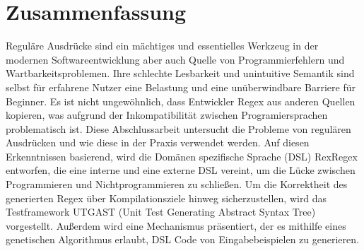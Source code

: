 \section*{Zusammenfassung}

Reguläre Ausdrücke sind ein mächtiges und essentielles Werkzeug in der modernen Softwareentwicklung aber auch Quelle von Programmierfehlern und Wartbarkeitsproblemen. Ihre schlechte Lesbarkeit und unintuitive Semantik sind selbst für erfahrene Nutzer eine Belastung und eine unüberwindbare Barriere für Beginner. Es ist nicht ungewöhnlich, dass Entwickler Regex aus anderen Quellen kopieren, was aufgrund der Inkompatibilität zwischen Programiersprachen problematisch ist. Diese Abschlussarbeit untersucht die Probleme von regulären Ausdrücken und wie diese in der Praxis verwendet werden. Auf diesen Erkenntnissen basierend, wird die Domänen spezifische Sprache (DSL) RexRegex entworfen, die eine interne und eine externe DSL vereint, um die Lücke zwischen Programmieren und Nichtprogrammieren zu schließen. Um die Korrektheit des generierten Regex über Kompilationsziele hinweg sicherzustellen, wird das Testframework UTGAST (Unit Test Generating Abstract Syntax Tree) vorgestellt. Außerdem wird eine Mechanismus präsentiert, der es mithilfe eines genetischen Algorithmus erlaubt, DSL Code von Eingabebeispielen zu generieren.

